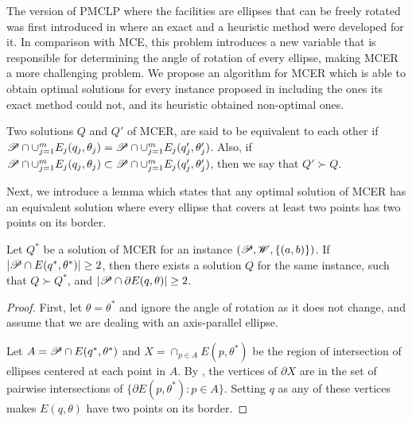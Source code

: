 The version of PMCLP where the facilities are ellipses that can be freely rotated was first introduced in \cite{andreta} where an exact and a heuristic method were developed for it. In comparison with MCE, this problem introduces a new variable that is responsible for determining the angle of rotation of every ellipse, making MCER a more challenging problem. We propose an algorithm for MCER which is able to obtain optimal solutions for every instance proposed in \cite{andreta} including the ones its exact method could not, and its heuristic obtained non-optimal ones.

\begin{definition}
	Two solutions $Q$ and $Q'$ of MCER, are said to be equivalent to each other if \mbox{$\mathscr{P} \cap \cup_{j=1}^m E_j(q_j, \theta_j) = \mathscr{P} \cap\cup_{j=1}^m E_j(q_j', \theta_j')$}. Also, if $\mathscr{P} \cap\cup_{j=1}^m E_j(q_j, \theta_j) \subset \mathscr{P} \cap\cup_{j=1}^m E_j(q_j', \theta_j')$, then we say that $Q' \succ Q$.
\end{definition}

Next, we introduce a lemma which states that any optimal solution of MCER has an equivalent solution where every ellipse that covers at least two points has two points on its border.

\begin{lem}\label{lema:mce_2b}
	Let $Q^*$ be a solution of MCER for an instance $(\mathscr{P}, \mathscr{W}, \{(a,b)\})$.
	If $|\mathscr{P} \cap E(q^*, \theta^*)| \ge 2$, then there exists a solution $Q$ for the same instance, such that $Q \succ Q^*$, and $|\mathscr{P} \cap \partial E(q, \theta)|\ge 2$.
\end{lem}

\begin{proof}
	First, let $\theta=\theta^*$ and ignore the angle of rotation as it does not change, and assume that we are dealing with an axis-parallel ellipse.
	
	Let $A=\mathscr{P} \cap E(q^*, \theta^*)$ and $X=\cap_{p \in A}E(p, \theta^*)$ be the region of intersection of ellipses centered at each point in $A$. By \cite{bi}, the vertices of $\partial X$ are in the set of pairwise intersections of $\{\partial E(p, \theta^*)\colon p \in A\}$. Setting $q$ as any of these vertices makes $E(q, \theta)$ have two points on its border.	
\end{proof}


